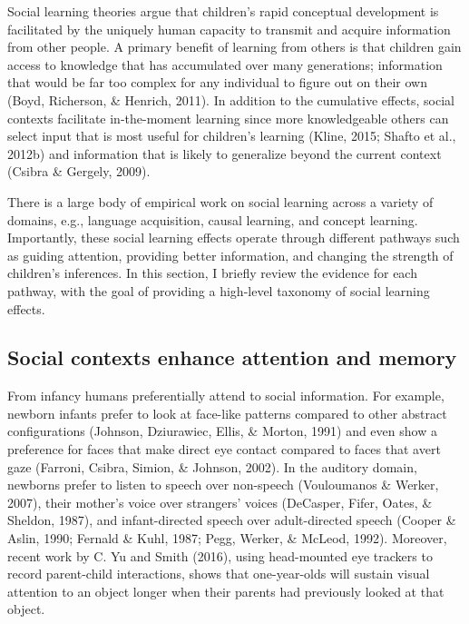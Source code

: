 \documentclass[english,floatsintext,man]{apa6}
\theoremstyle{definition}
\theoremstyle{definition}
\theoremstyle{definition}
\theoremstyle{remark}
\begin{document}
Social learning theories argue that children's rapid conceptual
development is facilitated by the uniquely human capacity to transmit
and acquire information from other people. A primary benefit of learning
from others is that children gain access to knowledge that has
accumulated over many generations; information that would be far too
complex for any individual to figure out on their own (Boyd, Richerson,
\& Henrich, 2011). In addition to the cumulative effects, social
contexts facilitate in-the-moment learning since more knowledgeable
others can select input that is most useful for children's learning
(Kline, 2015; Shafto et al., 2012b) and information that is likely to
generalize beyond the current context (Csibra \& Gergely, 2009).

There is a large body of empirical work on social learning across a
variety of domains, e.g., language acquisition, causal learning, and
concept learning. Importantly, these social learning effects operate
through different pathways such as guiding attention, providing better
information, and changing the strength of children's inferences. In this
section, I briefly review the evidence for each pathway, with the goal
of providing a high-level taxonomy of social learning effects.

\subsection{Social contexts enhance attention and
memory}\label{social-contexts-enhance-attention-and-memory}

From infancy humans preferentially attend to social information. For
example, newborn infants prefer to look at face-like patterns compared
to other abstract configurations (Johnson, Dziurawiec, Ellis, \& Morton,
1991) and even show a preference for faces that make direct eye contact
compared to faces that avert gaze (Farroni, Csibra, Simion, \& Johnson,
2002). In the auditory domain, newborns prefer to listen to speech over
non-speech (Vouloumanos \& Werker, 2007), their mother's voice over
strangers' voices (DeCasper, Fifer, Oates, \& Sheldon, 1987), and
infant-directed speech over adult-directed speech (Cooper \& Aslin,
1990; Fernald \& Kuhl, 1987; Pegg, Werker, \& McLeod, 1992). Moreover,
recent work by C. Yu and Smith (2016), using head-mounted eye trackers
to record parent-child interactions, shows that one-year-olds will
sustain visual attention to an object longer when their parents had
previously looked at that object.
\end{document}
